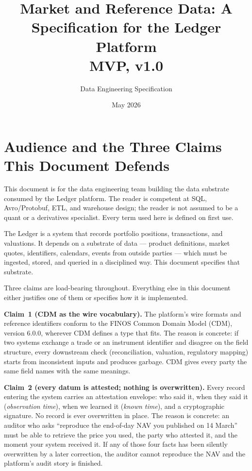\documentclass[11pt,a4paper]{article}
\title{Market and Reference Data: A Specification for the Ledger Platform\\[4pt]
\large MVP, v1.0}
\author{Data Engineering Specification}
\date{May 2026}
\begin{document}
\maketitle

\section{Audience and the Three Claims This Document Defends}

This document is for the data engineering team building the data substrate consumed by the Ledger platform. The reader is competent at SQL, Avro/Protobuf, ETL, and warehouse design; the reader is not assumed to be a quant or a derivatives specialist. Every term used here is defined on first use.

The Ledger is a system that records portfolio positions, transactions, and valuations. It depends on a substrate of data --- product definitions, market quotes, identifiers, calendars, events from outside parties --- which must be ingested, stored, and queried in a disciplined way. This document specifies that substrate.

Three claims are load-bearing throughout. Everything else in this document either justifies one of them or specifies how it is implemented.

\textbf{Claim~1 (CDM as the wire vocabulary).} The platform's wire formats and reference identifiers conform to the FINOS Common Domain Model (CDM), version 6.0.0, wherever CDM defines a type that fits. The reason is concrete: if two systems exchange a trade or an instrument identifier and disagree on the field structure, every downstream check (reconciliation, valuation, regulatory mapping) starts from inconsistent inputs and produces garbage. CDM gives every party the same field names with the same meanings.

\textbf{Claim~2 (every datum is attested; nothing is overwritten).} Every record entering the system carries an attestation envelope: who said it, when they said it (\emph{observation time}), when we learned it (\emph{known time}), and a cryptographic signature. No record is ever overwritten in place. The reason is concrete: an auditor who asks ``reproduce the end-of-day NAV you published on 14 March'' must be able to retrieve the price you used, the party who attested it, and the moment your system received it. If any of those four facts has been silently overwritten by a later correction, the auditor cannot reproduce the NAV and the platform's audit story is finished.
\end{document}
